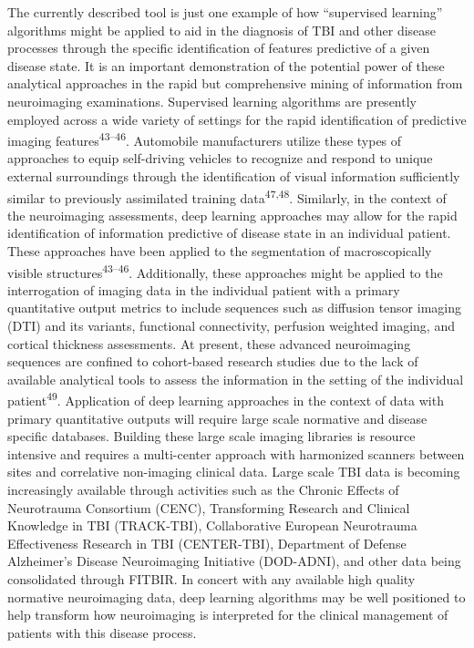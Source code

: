 \documentclass[11pt,]{article}
\begin{document}
The currently described tool is just one example of how ``supervised
learning'' algorithms might be applied to aid in the diagnosis of TBI
and other disease processes through the specific identification of
features predictive of a given disease state. It is an important
demonstration of the potential power of these analytical approaches in
the rapid but comprehensive mining of information from neuroimaging
examinations. Supervised learning algorithms are presently employed
across a wide variety of settings for the rapid identification of
predictive imaging features\textsuperscript{43--46}. Automobile
manufacturers utilize these types of approaches to equip self-driving
vehicles to recognize and respond to unique external surroundings
through the identification of visual information sufficiently similar to
previously assimilated training data\textsuperscript{47,48}. Similarly,
in the context of the neuroimaging assessments, deep learning approaches
may allow for the rapid identification of information predictive of
disease state in an individual patient. These approaches have been
applied to the segmentation of macroscopically visible
structures\textsuperscript{43--46}. Additionally, these approaches might
be applied to the interrogation of imaging data in the individual
patient with a primary quantitative output metrics to include sequences
such as diffusion tensor imaging (DTI) and its variants, functional
connectivity, perfusion weighted imaging, and cortical thickness
assessments. At present, these advanced neuroimaging sequences are
confined to cohort-based research studies due to the lack of available
analytical tools to assess the information in the setting of the
individual patient\textsuperscript{49}. Application of deep learning
approaches in the context of data with primary quantitative outputs will
require large scale normative and disease specific databases. Building
these large scale imaging libraries is resource intensive and requires a
multi-center approach with harmonized scanners between sites and
correlative non-imaging clinical data. Large scale TBI data is becoming
increasingly available through activities such as the Chronic Effects of
Neurotrauma Consortium (CENC), Transforming Research and Clinical
Knowledge in TBI (TRACK-TBI), Collaborative European Neurotrauma
Effectiveness Research in TBI (CENTER-TBI), Department of Defense
Alzheimer's Disease Neuroimaging Initiative (DOD-ADNI), and other data
being consolidated through FITBIR. In concert with any available high
quality normative neuroimaging data, deep learning algorithms may be
well positioned to help transform how neuroimaging is interpreted for
the clinical management of patients with this disease process.
\end{document}
